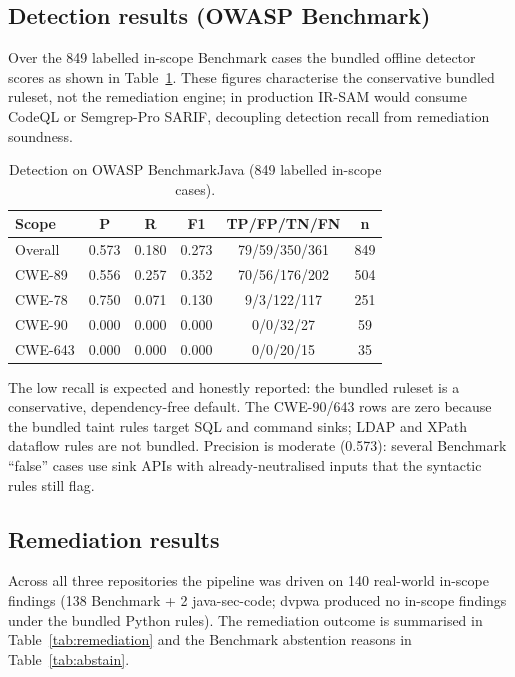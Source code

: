 \documentclass[11pt,a4paper]{article}
\newcommand{\irsam}{\mbox{IR\nobreakdash-SAM}}
\begin{document}
\subsection{Detection results (OWASP Benchmark)}
Over the 849 labelled in-scope Benchmark cases the bundled offline
detector scores as shown in Table~\ref{tab:bench-det}. These figures
characterise the conservative bundled ruleset, not the remediation
engine; in production \irsam{} would consume CodeQL or Semgrep-Pro SARIF,
decoupling detection recall from remediation soundness.

\begin{table}[h]
\centering
\caption{Detection on OWASP BenchmarkJava (849 labelled in-scope cases).}
\label{tab:bench-det}
\begin{tabular}{@{}lccccc@{}}
\toprule
\textbf{Scope} & \textbf{P} & \textbf{R} & \textbf{F1} & \textbf{TP/FP/TN/FN} & \textbf{n} \\
\midrule
Overall  & 0.573 & 0.180 & 0.273 & 79/59/350/361 & 849 \\
CWE-89   & 0.556 & 0.257 & 0.352 & 70/56/176/202 & 504 \\
CWE-78   & 0.750 & 0.071 & 0.130 & 9/3/122/117   & 251 \\
CWE-90   & 0.000 & 0.000 & 0.000 & 0/0/32/27     & 59 \\
CWE-643  & 0.000 & 0.000 & 0.000 & 0/0/20/15     & 35 \\
\bottomrule
\end{tabular}
\end{table}

The low recall is expected and honestly reported: the bundled ruleset is a
conservative, dependency-free default. The CWE-90/643 rows are zero
because the bundled taint rules target SQL and command sinks; LDAP and
XPath dataflow rules are not bundled. Precision is moderate (0.573):
several Benchmark ``false'' cases use sink APIs with already-neutralised
inputs that the syntactic rules still flag.

\subsection{Remediation results}
Across all three repositories the pipeline was driven on 140 real-world
in-scope findings (138 Benchmark + 2 java-sec-code; dvpwa produced no
in-scope findings under the bundled Python rules). The remediation outcome
is summarised in Table~\ref{tab:remediation} and the Benchmark abstention
reasons in Table~\ref{tab:abstain}.
\end{document}
